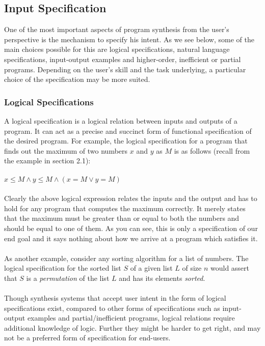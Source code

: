 \subsection{Input Specification}
One of the most important aspects of program synthesis from the user's perspective is the mechanism to specify his intent. As we see below, some of the main choices possible for this are logical specifications, natural language specifications, input-output examples and higher-order, inefficient or partial programs. Depending on the user's skill and the task underlying, a particular choice of the specification may be more suited.

\subsubsection{Logical Specifications}
A  logical  specification is a logical relation between inputs and outputs of a program. It can act as a precise and succinct form of functional specification of the desired program. For example, the logical specification for a program that finds out the maximum of two numbers $x$ and $y$ as $M$ is as follows (recall from the example in section 2.1): \\\\
$x \leq M \wedge y \leq M \wedge (x = M \vee y = M)$ \\\\
Clearly the above logical expression relates the inputs and the output and has to hold for any program that computes the maximum correctly. It merely states that the maximum must be greater than or equal to both the numbers and should be equal to one of them. As you can see, this is only a specification of our end goal and it says nothing about how we arrive at a program which satisfies it. \\\\
As another example, consider any sorting algorithm for a list of numbers. The logical specification for the sorted list $S$ of a given list $L$ of size $n$ would assert that $S$ is a \emph{permutation} of the list $L$ and has its elements \emph{sorted}. \\\\
Though synthesis systems that accept user intent in the form of logical specifications exist, compared to other forms of specifications such as input-output examples and partial/inefficient programs, logical relations require additional knowledge of logic. Further they might be harder to get right, and may not be a preferred form of specification for end-users.


